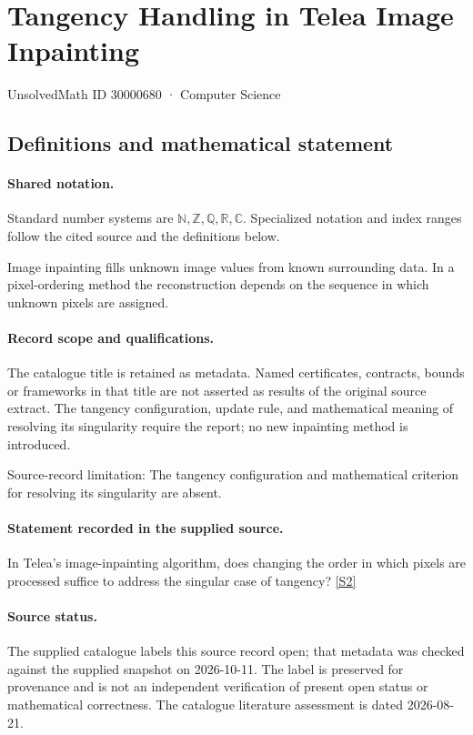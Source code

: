 \documentclass[11pt]{article}
\newcommand{\sref}[2]{\hyperlink{source:#1:#2}{[S#2]}}
\begin{document}
\setcounter{section}{30000679}
\section{Tangency Handling in Telea Image Inpainting}\label{30000680}
{\small\sffamily UnsolvedMath ID 30000680 · Computer Science}
\subsection{Definitions and mathematical statement}

\paragraph{Shared notation.}Standard number systems are $\mathbb N,\mathbb Z,\mathbb Q,\mathbb R,\mathbb C$. Specialized notation and index ranges follow the cited source and the definitions below.


Image inpainting fills unknown image values from known surrounding data. In a pixel-ordering method the reconstruction depends on the sequence in which unknown pixels are assigned.
\paragraph{Record scope and qualifications.}
The catalogue title is retained as metadata. Named certificates, contracts, bounds or frameworks in that title are not asserted as results of the original source extract.
The tangency configuration, update rule, and mathematical meaning of resolving its singularity require the report; no new inpainting method is introduced.

Source-record limitation: The tangency configuration and mathematical criterion for resolving its singularity are absent.
\paragraph{Statement recorded in the supplied source.}
In Telea's image-inpainting algorithm, does changing the order in which pixels are processed suffice to address the singular case of tangency? \sref{30000680}{2}
\paragraph{Source status.}
The supplied catalogue labels this source record open; that metadata was checked against the supplied snapshot on 2026-10-11. The label is preserved for provenance and is not an independent verification of present open status or mathematical correctness. The catalogue literature assessment is dated 2026-08-21.
\end{document}
